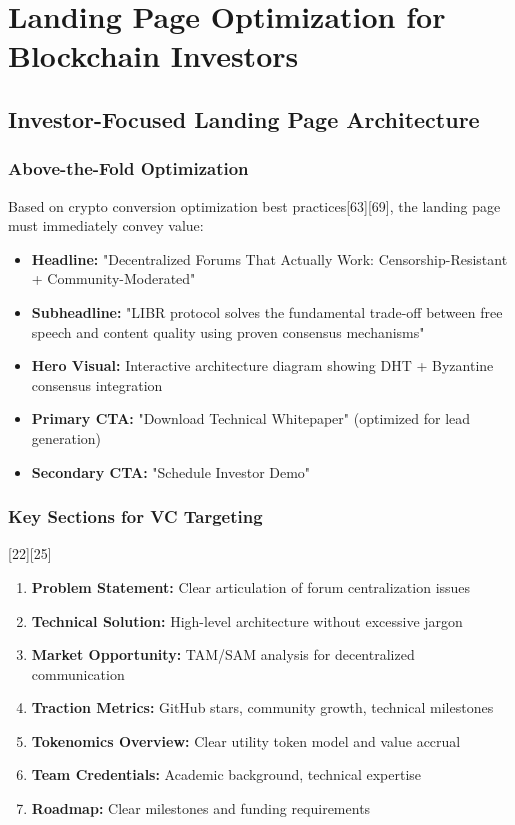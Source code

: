 \documentclass[12pt,a4paper]{article}
\begin{document}
\section{Landing Page Optimization for Blockchain Investors}

\subsection{Investor-Focused Landing Page Architecture}

\subsubsection{Above-the-Fold Optimization}
Based on crypto conversion optimization best practices[63][69], the landing page must immediately convey value:

\begin{itemize}
    \item \textbf{Headline:} "Decentralized Forums That Actually Work: Censorship-Resistant + Community-Moderated"
    \item \textbf{Subheadline:} "LIBR protocol solves the fundamental trade-off between free speech and content quality using proven consensus mechanisms"
    \item \textbf{Hero Visual:} Interactive architecture diagram showing DHT + Byzantine consensus integration
    \item \textbf{Primary CTA:} "Download Technical Whitepaper" (optimized for lead generation)
    \item \textbf{Secondary CTA:} "Schedule Investor Demo"
\end{itemize}

\subsubsection{Key Sections for VC Targeting}[22][25]
\begin{enumerate}
    \item \textbf{Problem Statement:} Clear articulation of forum centralization issues
    \item \textbf{Technical Solution:} High-level architecture without excessive jargon
    \item \textbf{Market Opportunity:} TAM/SAM analysis for decentralized communication
    \item \textbf{Traction Metrics:} GitHub stars, community growth, technical milestones
    \item \textbf{Tokenomics Overview:} Clear utility token model and value accrual
    \item \textbf{Team Credentials:} Academic background, technical expertise
    \item \textbf{Roadmap:} Clear milestones and funding requirements
\end{enumerate}
\end{document}
